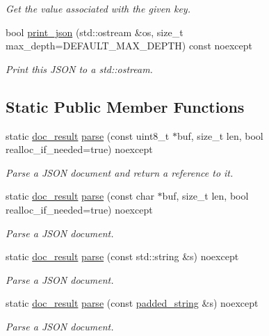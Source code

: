 \begin{DoxyCompactItemize}
\begin{DoxyCompactList}\small\item\em Get the value associated with the given key. \end{DoxyCompactList}\item 
bool \hyperlink{classsimdjson_1_1document_ad33e6862de5cd09b2a16b10a90768360}{print\+\_\+json} (std\+::ostream \&os, size\+\_\+t max\+\_\+depth=D\+E\+F\+A\+U\+L\+T\+\_\+\+M\+A\+X\+\_\+\+D\+E\+P\+TH) const noexcept
\begin{DoxyCompactList}\small\item\em Print this J\+S\+ON to a std\+::ostream. \end{DoxyCompactList}\end{DoxyCompactItemize}
\subsection*{Static Public Member Functions}
\begin{DoxyCompactItemize}
\item 
static \hyperlink{classsimdjson_1_1document_1_1doc__result}{doc\+\_\+result} \hyperlink{classsimdjson_1_1document_a6f11cda7c4a06fffdc00fdc97d98ae2b}{parse} (const uint8\+\_\+t $\ast$buf, size\+\_\+t len, bool realloc\+\_\+if\+\_\+needed=true) noexcept
\begin{DoxyCompactList}\small\item\em Parse a J\+S\+ON document and return a reference to it. \end{DoxyCompactList}\item 
static \hyperlink{classsimdjson_1_1document_1_1doc__result}{doc\+\_\+result} \hyperlink{classsimdjson_1_1document_a3a5615617db0d10dad534fe564a89ad3}{parse} (const char $\ast$buf, size\+\_\+t len, bool realloc\+\_\+if\+\_\+needed=true) noexcept
\begin{DoxyCompactList}\small\item\em Parse a J\+S\+ON document. \end{DoxyCompactList}\item 
static \hyperlink{classsimdjson_1_1document_1_1doc__result}{doc\+\_\+result} \hyperlink{classsimdjson_1_1document_a698a6147c2148a7e17d949af3532f145}{parse} (const std\+::string \&s) noexcept
\begin{DoxyCompactList}\small\item\em Parse a J\+S\+ON document. \end{DoxyCompactList}\item 
static \hyperlink{classsimdjson_1_1document_1_1doc__result}{doc\+\_\+result} \hyperlink{classsimdjson_1_1document_a793655697f46f02ff0def1b940d0155a}{parse} (const \hyperlink{structsimdjson_1_1padded__string}{padded\+\_\+string} \&s) noexcept
\begin{DoxyCompactList}\small\item\em Parse a J\+S\+ON document. \end{DoxyCompactList}\end{DoxyCompactItemize}


